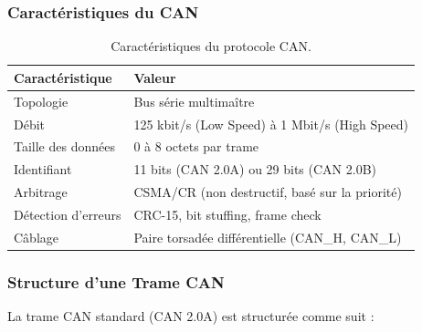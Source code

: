 \documentclass[12pt,a4paper,twoside]{report}
\begin{document}
\subsubsection{Caractéristiques du CAN}

\begin{table}[H]
\centering
\caption{Caractéristiques du protocole CAN.}
\label{tab:can_specs}
\renewcommand{\arraystretch}{1.3}
\begin{tabular}{|l|l|}
\hline
\rowcolor{stellantisblue!15}
\textbf{Caractéristique} & \textbf{Valeur} \\
\hline
Topologie & Bus série multimaître \\
\hline
Débit & 125 kbit/s (Low Speed) à 1 Mbit/s (High Speed) \\
\hline
Taille des données & 0 à 8 octets par trame \\
\hline
Identifiant & 11 bits (CAN 2.0A) ou 29 bits (CAN 2.0B) \\
\hline
Arbitrage & CSMA/CR (non destructif, basé sur la priorité) \\
\hline
Détection d'erreurs & CRC-15, bit stuffing, frame check \\
\hline
Câblage & Paire torsadée différentielle (CAN\_H, CAN\_L) \\
\hline
\end{tabular}
\end{table}

\subsubsection{Structure d'une Trame CAN}

La trame CAN standard (CAN 2.0A) est structurée comme suit :
\end{document}
